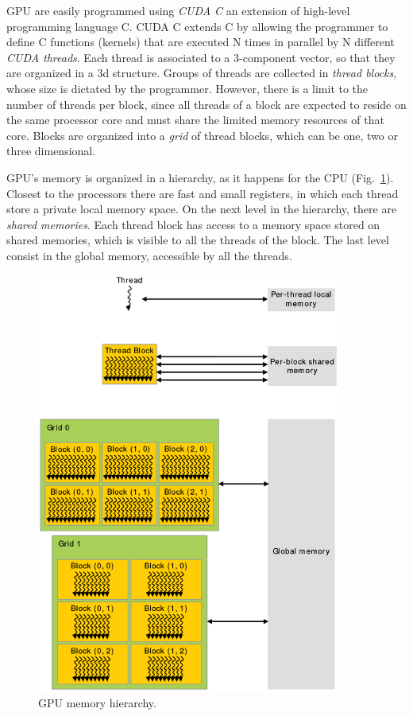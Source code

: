 GPU are easily programmed using \textit{CUDA C} an extension of high-level programming language C. CUDA C extends C by allowing the programmer to define C functions (kernels) that are executed N times in parallel by N different \textit{CUDA threads}. Each thread is associated to a 3-component vector, so that they are organized in a 3d structure. Groups of threads are collected in \textit{thread blocks}, whose size is dictated by the programmer. However, there is a limit to the number of threads per block, since all threads of a block are expected to reside on the same processor core and must share the limited memory resources of that core. Blocks are organized into a \textit{grid} of thread blocks, which can be one, two or three dimensional.

GPU's memory is organized in a hierarchy, as it happens for the CPU (Fig.~\ref{fig:GPU-memory-hierarchy}). Closest to the processors there are fast and small registers, in which each thread store a private local memory space. On the next level in the hierarchy, there are \textit{shared memories}. Each thread block has access to a memory space stored on shared memories, which is visible to all the threads of the block. The last level consist in the global memory, accessible by all the threads.
\begin{figure}
   \centering
   \includegraphics[width=10cm]{Figs/GPU_memory_hierarchy.eps}
   \caption{GPU memory hierarchy.} \label{fig:GPU-memory-hierarchy}
\end{figure}


